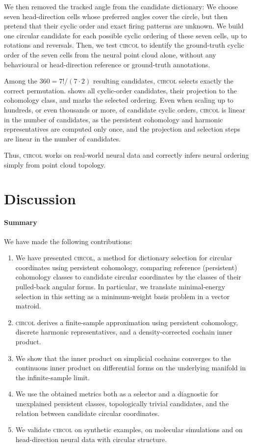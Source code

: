 \documentclass[a4paper,11pt, DIV=10]{scrartcl}
\numberwithin{equation}{section}
\theoremstyle{definition}
\theoremstyle{remark}
\begin{document}
We then removed the tracked angle from the candidate dictionary:
We choose seven head-direction cells whose preferred angles cover the circle, but then pretend that their cyclic order and exact firing patterns are unknown.
We build one circular candidate for each possible cyclic ordering of these seven cells, up to rotations and reversals.
Then, we test \textsc{circol} to identify the ground-truth cyclic order of the seven cells from the neural point cloud alone, without any behavioural or head-direction reference or ground-truth annotations.

Among the $360=7!/(7\cdot 2)$ resulting candidates, \textsc{circol} selects exactly the correct permutation.
 shows all cyclic-order candidates, their projection to the cohomology class,  and marks the selected ordering.
Even when scaling up to hundreds, or even thousands or more, of candidate cyclic orders, \textsc{circol} is linear in the number of candidates, as the persistent cohomology and harmonic representatives are computed only once, and the projection and selection steps are linear in the number of candidates.

Thus, \textsc{circol} works on real-world neural data and correctly infers neural ordering simply from point cloud topology.
\FloatBarrier

\section{Discussion}
\label{sec:discussion}
\paragraph{Summary}
We have made the following contributions:
\begin{enumerate}
	\item We have presented \textsc{circol}, a method for dictionary selection for circular coordinates using persistent cohomology, comparing reference (persistent) cohomology classes to candidate circular coordinates by the classes of their pulled-back angular forms.
	In particular, we translate minimal-energy selection in this setting as a minimum-weight basis problem in a vector matroid.
	\item \textsc{circol} derives a finite-sample approximation using persistent cohomology, discrete harmonic representatives, and a density-corrected cochain inner product.
	\item We show that the inner product on simplicial cochains converges to the continuous inner product on differential forms on the underlying manifold in the infinite-sample limit.
	\item We use the obtained metrics both as a selector and a diagnostic for unexplained persistent classes, topologically trivial candidates, and the relation between candidate circular coordinates.
	\item We validate \textsc{circol} on synthetic examples, on molecular simulations and on head-direction neural data with circular structure.
\end{enumerate}
\end{document}
